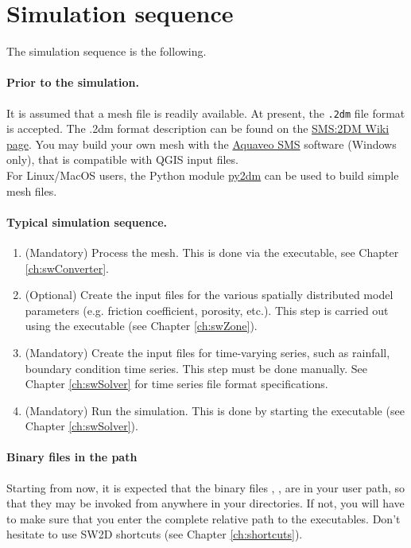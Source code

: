 \section{Simulation sequence}

The \swdd simulation sequence is the following.

\paragraph*{Prior to the simulation.}
It is assumed that a mesh file is readily available. At present, the \texttt{.2dm} file format is accepted. The .2dm format description can be found on the \href{https://www.xmswiki.com/wiki/SMS:2D_Mesh_Files_*.2dm}{SMS:2DM Wiki page}.
You may build your own mesh with the \href{https://aquaveo.com/software/sms/}{Aquaveo SMS} software (Windows only), that is compatible with QGIS input files.\\
For Linux/MacOS users, the Python module \href{https://py2dm.readthedocs.io/}{py2dm} can be used to build simple mesh files.

\paragraph*{Typical simulation sequence.}
\begin{enumerate}
	\item (Mandatory) Process the mesh. This is done via the \swConverter executable, see Chapter \ref{ch:swConverter}.
	\item (Optional) Create the input files for the various spatially distributed model parameters (e.g. friction coefficient, porosity, etc.). This step is carried out using the \swZone executable (see Chapter \ref{ch:swZone}).
	\item (Mandatory) Create the input files for time-varying series, such as rainfall, boundary condition time series. This step must be done manually. See Chapter \ref{ch:swSolver} for time series file format specifications.
	\item  (Mandatory) Run the simulation. This is done by starting the \swSolver executable (see Chapter \ref{ch:swSolver}).
\end{enumerate}

\paragraph*{Binary files in the path}
Starting from now, it is expected that the binary files \swConverter, \swZone, \swSolver are in your user path, so that they may be invoked from anywhere in your directories. If not, you will have to make sure that you enter the complete relative path to the executables. Don't hesitate to use SW2D shortcuts (see Chapter \ref{ch:shortcuts}).